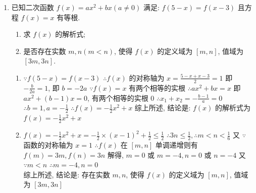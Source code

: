 \begin{enumerate}
\begin{vspace_}
\vsp[5]
\end{vspace_}


\item 已知二次函数 $f(x)=a x^2+b x(a \neq 0)$ 满足: $f(5-x)=f(x-3)$ 且方程 $f(x)=x$ 有等根. 
\begin{enumerate}
\item 求 $f(x)$ 的解析式;
\item 是否存在实数 $m, n(m<n)$, 使得 $f(x)$ 的定义域为 $[m, n]$, 值域为 $[3 m, 3 n]$.
\end{enumerate}
\begin{jieda}
\begin{enumerate}
\item $\because f(5-x)=f(x-3)$
$\therefore f(x)$ 的对称轴为 $x=\frac{5-x+x-3}{2}=1$
即 $-\frac{b}{2 a}=1$, 即 $b=-2 a$
$\because f(x)=x$ 有两个相等的实根
$\therefore a x^2+b x=x$
即 $a x^2+(b-1) x=0$, 有两个相等的实根 0
$\therefore x_1+x_2=-\frac{b-1}{a}=0$
$\therefore b=1, a=-\frac{1}{2}$
$\therefore f(x)=-\frac{1}{2} x^2+x$
综上所述, 结论是: $f(x)$ 的解析式为
$f(x)=-\frac{1}{2} x^2+x$
\item $f(x)=-\frac{1}{2} x^2+x=-\frac{1}{2} \times(x-1)^2+\frac{1}{2} \leq \frac{1}{2}$
$\therefore 3 n \leq \frac{1}{2}, \therefore m<n<\frac{1}{6}$
又 $\because$ 函数的对称轴为 $x=1$
$\therefore f(x)$ 在 $[m, n]$ 单调递增则有 $f(m)=3 m, f(n)=3 n$
解得, $m=0$ 或 $m=-4, n=0$ 或 $n=-4$
又 $\because m<n$
$\therefore m=-4, n=0$\\
综上所述, 结论是: 存在实数 $m, n$, 使得 $f(x)$ 的定义域为 $[m, n]$, 值域为 $[3 m, 3 n]$
\end{enumerate}
\end{jieda}

\begin{vspace_}
\vsp[5]
\end{vspace_}
\end{enumerate}


